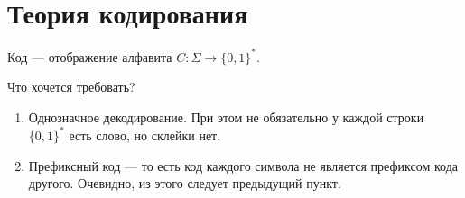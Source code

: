 
\section{Теория кодирования}
Код --- отображение алфавита $ C \colon \Sigma \to \{0, 1\}^{*}$.

Что хочется требовать?
\begin{enumerate}
    \item Однозначное декодирование. При этом не обязательно у каждой строки $ \{0, 1\}^{*}$ есть слово, но склейки нет.
	\item Префиксный код --- то есть код каждого символа не является префиксом кода другого. Очевидно, из этого следует предыдущий пункт.
\end{enumerate} 

